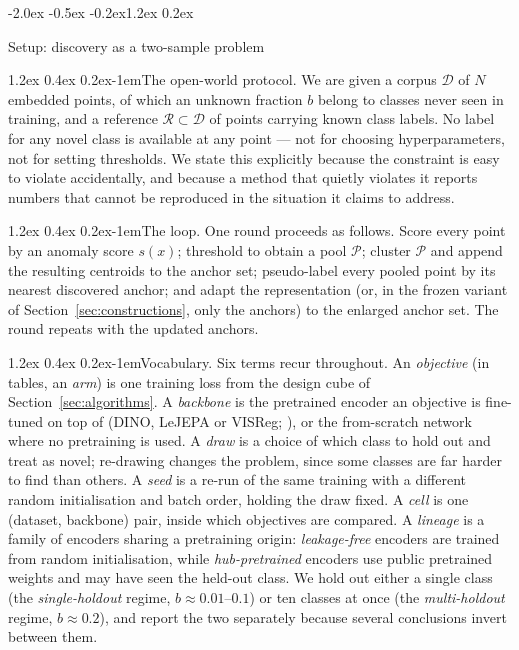 \documentclass{article}
\makeatletter
\renewcommand\section{\@startsection{section}{1}{\z@}%
  {-2.0ex \@plus -0.5ex \@minus -0.2ex}{1.2ex \@plus 0.2ex}%
  {\large\bf\raggedright}}
\renewcommand\paragraph{\@startsection{paragraph}{4}{\z@}%
  {1.2ex \@plus 0.4ex \@minus 0.2ex}{-1em}{\normalsize\bf}}
\newcommand{\R}{\mathcal{R}}
\newcommand{\D}{\mathcal{D}}
\newcommand{\pool}{\mathcal{P}}
\makeatother
\begin{document}
\section{Setup: discovery as a two-sample problem}
\label{sec:setup}

\paragraph{The open-world protocol.}
We are given a corpus $\D$ of $N$ embedded points, of which an unknown
fraction $b$ belong to classes never seen in training, and a reference
$\R \subset \D$ of points carrying known class labels. No label for any novel
class is available at any point --- not for choosing hyperparameters, not for
setting thresholds. We state this explicitly because the constraint is easy to
violate accidentally, and because a method that quietly violates it reports
numbers that cannot be reproduced in the situation it claims to address.

\paragraph{The loop.}
One round proceeds as follows. Score every point by an anomaly score $s(x)$;
threshold to obtain a pool $\pool$; cluster $\pool$ and append the resulting
centroids to the anchor set; pseudo-label every pooled point by its nearest
discovered anchor; and adapt the representation (or, in the frozen variant of
Section~\ref{sec:constructions}, only the anchors) to the enlarged anchor set.
The round repeats with the updated anchors.

\paragraph{Vocabulary.}
Six terms recur throughout. An \emph{objective} (in tables, an \emph{arm})
is one training loss from the design cube of
Section~\ref{sec:algorithms}. A \emph{backbone} is the pretrained encoder an
objective is fine-tuned on top of (DINO, LeJEPA or VISReg;
\citealp{caron2021dino,balestriero2025lejepa,wu2026visreg}), or the
from-scratch network where no pretraining is used. A \emph{draw} is a choice
of which class to hold out and treat as novel; re-drawing changes the
problem, since some classes are far harder to find than others. A \emph{seed}
is a re-run of the same training with a different random initialisation and
batch order, holding the draw fixed. A \emph{cell} is one (dataset, backbone)
pair, inside which objectives are compared. A \emph{lineage} is a family of
encoders sharing a pretraining origin: \emph{leakage-free} encoders are
trained from random initialisation, while \emph{hub-pretrained} encoders use
public pretrained weights and may have seen the held-out class. We hold out
either a single class (the \emph{single-holdout} regime,
$b \approx 0.01$--$0.1$) or ten classes at once (the \emph{multi-holdout}
regime, $b \approx 0.2$), and report the two separately because several
conclusions invert between them.
\end{document}
